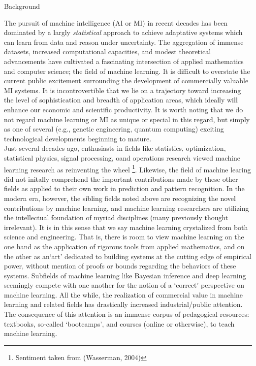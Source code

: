 \documentclass[10pt]{article}
\newenvironment{changemargin}[2]{%
\begin{list}{}{%
\setlength{\topsep}{0pt}%
\setlength{\leftmargin}{#1}%
\setlength{\rightmargin}{#2}%
\setlength{\listparindent}{\parindent}%
\setlength{\itemindent}{\parindent}%
\setlength{\parsep}{\parskip}%
}%
\item[]}{\end{list}}
\renewcommand{\it}{\textit}
\begin{document}
\begin{changemargin}{+-1cm}{-3cm}
\vspace{1cm}
\noindent
\large{Background}\\
\small

\noindent
The pursuit of machine intelligence (AI or MI) in recent decades has been dominated by a largly \it{statistical} approach to achieve adaptative systems which can learn from data and reason under uncertainty. The aggregation of immense datasets, increased computational capacities, and modest theoretical advancements have cultivated a fascinating intersection of applied mathematics and computer science; the field of machine learning. It is difficult to overstate the current public excitement surrounding the development of commercially valuable MI systems. It is incontrovertible that we lie on a trajectory toward increasing the level of sophistication and breadth of application areas, which ideally will enhance our economic and scientific productivity. It is worth noting that we do not regard machine learning or MI as unique or special in this regard, but simply as one of several (e.g., genetic engineering, quantum computing) exciting technological developments beginning to mature. \\

Just several decades ago, enthusiasts in fields like statistics, optimization, statistical physics, signal processing, oand operations research viewed machine learning research as reinventing the wheel \footnote{Sentiment taken from (Wasserman, 2004)}. Likewise, the field of machine learing did not initally comprehend the important contributions made by these other fields as applied to their own work in prediction and pattern recognition. In the modern era, however, the sibling fields noted above are recognizing the novel contributions by machine learning, and machine learning researchers are utilizing the intellectual foundation of myriad disciplines (many previously thought irrelevant). It is in this sense that we say machine learning crystalized from both science and engineering. That is, there is room to view machine learning on the one hand as the application of rigorous tools from applied mathematics, and on the other as an`art' dedicated to building systems at the cutting edge of empirical power, without mention of proofs or bounds regarding the behaviors of these systems. Subfields of machine learning like Bayesian inference and deep learning seemingly compete with one another for the notion of a `correct' perspective on machine learning. All the while, the realization of commercial value in machine learning and related fields has drastically increased industrial/public attention. The consequence of this attention is an immense corpus of pedagogical resources: textbooks, so-called `bootcamps', and courses (online or otherwise), to teach machine learning. \\


\end{changemargin}
\end{document}
